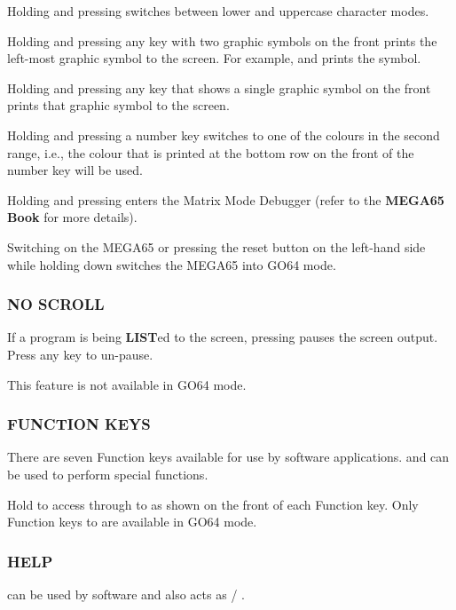 Holding  and pressing \megasymbolkey switches between lower and uppercase character modes.

Holding \megasymbolkey and pressing any key with two graphic symbols on the front prints the left-most graphic symbol to the screen. For example,
\megasymbolkey and  prints the  symbol.

Holding \megasymbolkey and pressing any key that shows a single graphic symbol on the front prints that graphic symbol to the screen.

Holding \megasymbolkey and pressing a number key switches to one of the colours in the second range, i.e., the colour that is printed at the bottom row on the front of the number key will be used.

Holding \megasymbolkey and pressing  enters the Matrix Mode Debugger (refer to the {\bf MEGA65 Book} for more details).

Switching on the MEGA65 or pressing the reset button on the left-hand side while holding down \megasymbolkey switches the MEGA65 into GO64 mode.

\subsubsection{NO SCROLL}
If a program is being {\bf LIST}ed to the screen, pressing  pauses the screen output. Press any key to un-pause.

This feature is not available in GO64 mode.

\subsubsection{FUNCTION KEYS}
There are seven Function keys available for use by software applications.       and  can be used to perform special functions.

Hold  to access  through to  as shown on the front of each Function key.
Only Function keys  to  are available in GO64 mode.

\subsubsection{HELP}
 can be used by software and also acts as  / .


